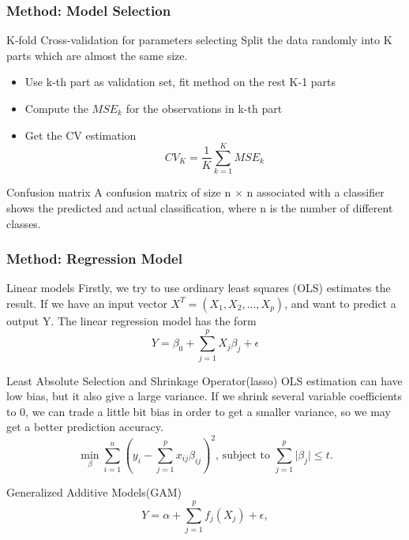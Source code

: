 \documentclass{beamer}
\begin{document}
\begin{frame}
\frametitle{Method: Model Selection}
\begin{block}{K-fold Cross-validation for parameters selecting}
Split the data randomly into K parts which are almost the same size. \\
    \begin{itemize}
      \item{Use k-th part as validation set, fit method on the rest K-1 parts}
      \item{Compute the $MSE_k$ for the observations in k-th part}
      \item{Get the CV estimation $$ CV_K = \frac{1}{K} \sum_{k=1}^{K} MSE_k$$}
    \end{itemize}

\end{block}

\begin{block}{Confusion matrix}
A confusion matrix of size n $\times$ n associated with a classifier shows the predicted and actual classification, where n is the number of different classes.
\end{block}

\end{frame}


\begin{frame}
\frametitle{Method: Regression Model}
\begin{block}{Linear models}
Firstly, we try to use ordinary least squares (OLS) estimates the result. If we have an input vector $X^T=(X_1,X_2,...,X_p)$, and want to predict a output Y. The linear regression model has the form $$Y=\beta_0+\sum_{j=1}^{p} X_j\beta_j + \epsilon$$
\end{block}

\begin{block}{Least Absolute Selection and Shrinkage Operator(lasso)}
OLS estimation can have low bias, but it also give a large variance. If we shrink several variable coefficients to 0, we can trade a little bit bias in order to get a smaller variance, so we may get a better prediction accuracy.
$$\min_{\beta} \sum_{i=1}^{n} (y_i-\sum_{j=1}^{p} x_{ij}\beta_{ij})^2 \text{, subject to } \sum_{j=1}^{p} \lvert \beta_j \rvert \leq t.$$
\end{block}

\begin{block}{Generalized Additive Models(GAM)}
$$Y=\alpha+\sum_{j=1}^{p} f_j(X_j)+\epsilon,$$
\end{block}

\end{frame}
\end{document}
